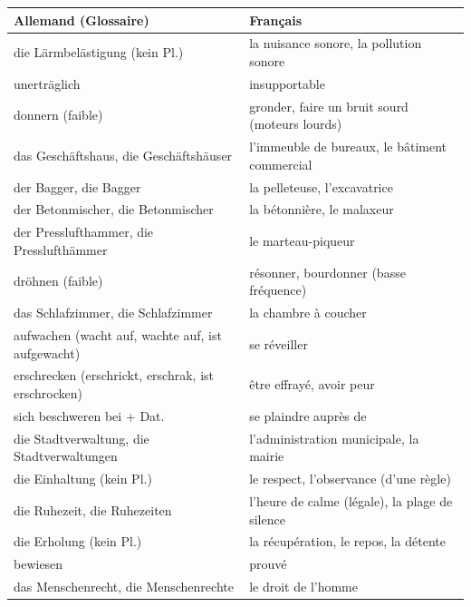 \documentclass[11pt]{article}
\begin{document}
\begin{center}
\begin{tabularx}{\linewidth}{|X|X|}
\hline
\rowcolor{popblueL} \textbf{Allemand (Glossaire)} & \textbf{Français} \\
\hline
die Lärmbelästigung (kein Pl.) & la nuisance sonore, la pollution sonore \\
unerträglich & insupportable \\
donnern (faible) & gronder, faire un bruit sourd (moteurs lourds) \\
das Geschäftshaus, die Geschäftshäuser & l'immeuble de bureaux, le bâtiment commercial \\
der Bagger, die Bagger & la pelleteuse, l'excavatrice \\
der Betonmischer, die Betonmischer & la bétonnière, le malaxeur \\
der Presslufthammer, die Presslufthämmer & le marteau-piqueur \\
dröhnen (faible) & résonner, bourdonner (basse fréquence) \\
das Schlafzimmer, die Schlafzimmer & la chambre à coucher \\
aufwachen (wacht auf, wachte auf, ist aufgewacht) & se réveiller \\
erschrecken (erschrickt, erschrak, ist erschrocken) & être effrayé, avoir peur \\
sich beschweren bei + Dat. & se plaindre auprès de \\
die Stadtverwaltung, die Stadtverwaltungen & l'administration municipale, la mairie \\
die Einhaltung (kein Pl.) & le respect, l'observance (d'une règle) \\
die Ruhezeit, die Ruhezeiten & l'heure de calme (légale), la plage de silence \\
die Erholung (kein Pl.) & la récupération, le repos, la détente \\
bewiesen & prouvé \\
das Menschenrecht, die Menschenrechte & le droit de l'homme \\
\hline
\end{tabularx}
\end{center}
\end{document}
